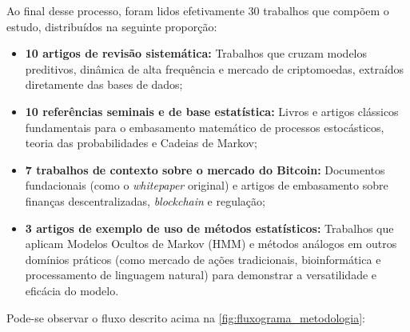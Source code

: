 \documentclass[
    12pt,                %
    openright,           %
    oneside,             %
    a4paper,             %
    english,             %
    brazil               %
]{abntex2}
\begin{document}
Ao final desse processo, foram lidos efetivamente 30 trabalhos que compõem o estudo, distribuídos na seguinte proporção:
\begin{itemize}
    \item \textbf{10 artigos de revisão sistemática:} Trabalhos que cruzam modelos preditivos, dinâmica de alta frequência e mercado de criptomoedas, extraídos diretamente das bases de dados;
    \item \textbf{10 referências seminais e de base estatística:} Livros e artigos clássicos fundamentais para o embasamento matemático de processos estocásticos, teoria das probabilidades e Cadeias de Markov;
    \item \textbf{7 trabalhos de contexto sobre o mercado do Bitcoin:} Documentos fundacionais (como o \textit{whitepaper} original) e artigos de embasamento sobre finanças descentralizadas, \textit{blockchain} e regulação;
    \item \textbf{3 artigos de exemplo de uso de métodos estatísticos:} Trabalhos que aplicam Modelos Ocultos de Markov (HMM) e métodos análogos em outros domínios práticos (como mercado de ações tradicionais, bioinformática e processamento de linguagem natural) para demonstrar a versatilidade e eficácia do modelo.
\end{itemize}

Pode-se observar o fluxo descrito acima na \autoref{fig:fluxograma_metodologia}:
\end{document}
